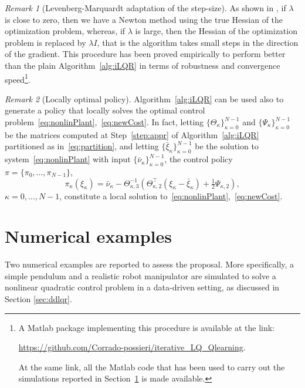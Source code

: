 \documentclass[10pt]{IEEEtran}      %
\theoremstyle{theorem}
\theoremstyle{remark}
\newtheorem{remm}{Remark}
\begin{document}
\begin{remm}[Levenberg-Marquardt adaptation of the step-size]
\noindent As shown in \cite{1469949}, if $\lambda$ is close to zero, then we have a Newton method using the true Hessian
of the optimization problem, whereas, if $\lambda$ is large, then the Hessian of the optimization problem is replaced by $\lambda I$,
that is the algorithm takes small steps in the direction of the gradient. This procedure has been proved empirically to perform better 
than the plain Algorithm~\ref{alg:iLQR} in terms of robustness and convergence speed\footnote{A Matlab package implementing
this procedure is available at the link:
\begin{center}
\url{https://github.com/Corrado-possieri/iterative_LQ_Qlearning}.
\end{center}
At the same link, all the Matlab code that has been used to carry out the simulations reported in Section~\ref{sec:results}
is made available.
}.
\end{remm}

\begin{remm}[Locally optimal policy]\label{rem:localpol}
Algorithm~\ref{alg:iLQR} can be used also to generate a policy that locally solves the optimal 
control problem~\eqref{eq:nonlinPlant},~\eqref{eq:newCost}. In fact, 
letting $\{\Theta_\kappa\}_{\kappa=0}^{N-1}$ and $\{\Psi_{\kappa}\}_{\kappa=0}^{N-1}$ 
be the matrices computed at Step~\ref{step:appr} of Algorithm~\ref{alg:iLQR} partitioned as in~\eqref{eq:partition}, 
and letting $\{\bar{\xi}_\kappa\}_{\kappa=0}^{N-1}$ be the solution to system~\eqref{eq:nonlinPlant} with input $\{\bar{\nu}_{\kappa}\}_{\kappa=0}^{N-1}$, the control policy $\pi=\{\pi_0,\dots,\pi_{N-1} \}$,
\begin{equation*}
\pi_\kappa(\xi_\kappa) = \bar{\nu}_{\kappa}-\Theta_{\kappa,3}^{-1}\left(\Theta_{\kappa,2}^\top ({\xi}_{\kappa}-\bar{\xi}_{\kappa})+\tfrac{1}{2}\Psi_{\kappa,2}\right),
\end{equation*}
$\kappa=0,\dots,N-1$, constitute a local solution to~\eqref{eq:nonlinPlant},~\eqref{eq:newCost}.
\end{remm}

\section{Numerical examples}\label{sec:results}
Two numerical examples are reported to assess the proposal. More specifically, a simple pendulum and a realistic robot manipulator are simulated to solve a nonlinear quadratic control problem in a data-driven setting, as discussed in Section \ref{sec:ddlqr}.
\end{document}
